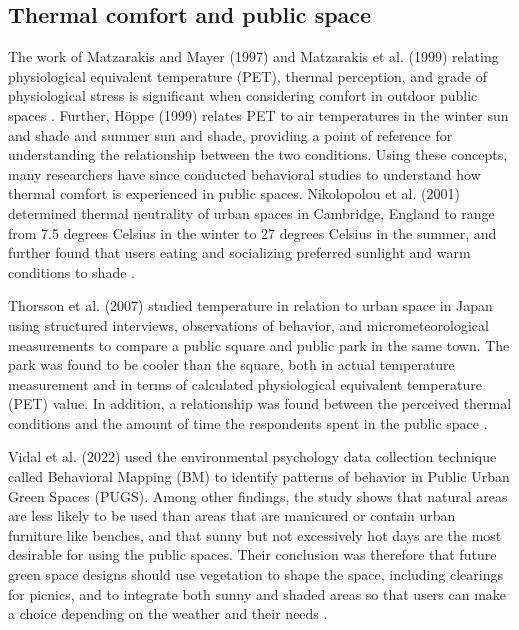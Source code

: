 \begin{multicols}{2}
\section{Thermal comfort and public space}
The work of Matzarakis and Mayer (1997) and Matzarakis et al. (1999) relating physiological equivalent temperature (PET), thermal perception, and grade of physiological stress is significant when considering comfort in outdoor public spaces \cite{matzarakis_urban_1997}\cite{matzarakis_applications_1999}. Further, Höppe (1999) relates PET to air temperatures in the winter sun and shade and summer sun and shade, providing a point of reference for understanding the relationship between the two conditions. Using these concepts, many researchers have since conducted behavioral studies to understand how thermal comfort is experienced in public spaces. Nikolopolou et al. (2001) determined thermal neutrality of urban spaces in Cambridge, England to range from 7.5 degrees Celsius in the winter to 27 degrees Celsius in the summer, and further found that users eating and socializing preferred sunlight and warm conditions to shade \cite{nikolopoulou_thermal_2001}. 

Thorsson et al. (2007) studied temperature in relation to urban space in Japan using structured interviews, observations of behavior, and micrometeorological measurements to compare a public square and public park in the same town. The park was found to be cooler than the square, both in actual temperature measurement and in terms of calculated physiological equivalent temperature (PET) value. In addition, a relationship was found between the perceived thermal conditions and the amount of time the respondents spent in the public space \cite{thorsson_thermal_2007}.

Vidal et al. (2022) used the environmental psychology data collection technique called Behavioral Mapping (BM) to identify patterns of behavior in Public Urban Green Spaces (PUGS). Among other findings, the study shows that natural areas are less likely to be used than areas that are manicured or contain urban furniture like benches, and that sunny but not excessively hot days are the most desirable for using the public spaces. Their conclusion was therefore that future green space designs should use vegetation to shape the space, including clearings for picnics, and to integrate both sunny and shaded areas so that users can make a choice depending on the weather and their needs \cite{vidal_patterns_2022}. 


\end{multicols}
